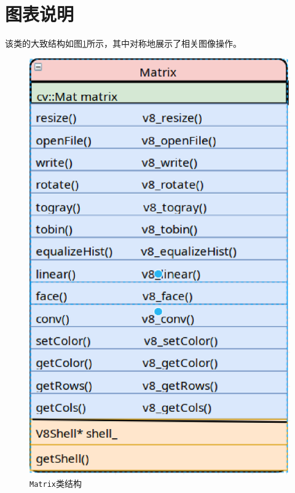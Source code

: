 \documentclass[a4paper,11pt,fontset=fandol]{article}
\begin{document}
\section{图表说明}
该类的大致结构如图\ref{1.1}所示，其中对称地展示了相关图像操作。
\begin{figure}[H]
    \centering
    \includegraphics[scale=0.5]{fig//matrix.eps}
    \caption{\texttt{Matrix}类结构}
    \label{1.1}
\end{figure}
\end{document}

